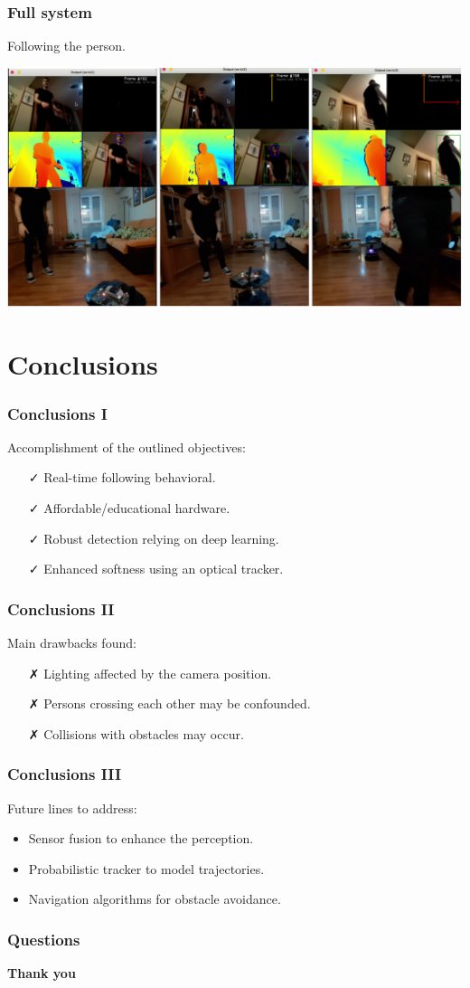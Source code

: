 \documentclass[11pt]{beamer}
\begin{document}
\begin{frame}
	\frametitle{Full system}
	Following the person.
	\begin{center}
		\href{https://www.youtube.com/watch?v=WZ0riKMwJWA}{\includegraphics[width=0.75\linewidth]{final_test}}
	\end{center}
\end{frame}

\section{Conclusions}
\begin{frame}
	\frametitle{Conclusions I}
	Accomplishment of the outlined objectives:
	\begin{itemize}
		\item [\faCheck] Real-time following behavioral.
		\item [\faCheck] Affordable/educational hardware.\pause
		\item [\faCheck] Robust detection relying on deep learning.\pause
		\item [\faCheck] Enhanced softness using an optical tracker.
	\end{itemize}
\end{frame}
\begin{frame}
	\frametitle{Conclusions II}
	Main drawbacks found:
	\begin{itemize}
		\item [\faClose] Lighting affected by the camera position.\pause
		\item [\faClose] Persons crossing each other may be confounded.\pause
		\item [\faClose] Collisions with obstacles may occur.
	\end{itemize}
\end{frame}

\begin{frame}
	\frametitle{Conclusions III}
	Future lines to address:
	\begin{itemize}
		\item Sensor fusion to enhance the perception.\pause
		\item Probabilistic tracker to model trajectories.\pause
		\item Navigation algorithms for obstacle avoidance.
	\end{itemize}
\end{frame}

\begin{frame}
	\frametitle{Questions}
\end{frame}

\begin{frame}
	\begin{center}
		\huge \textbf{Thank you}
	\end{center}
\end{frame}
\end{document}
